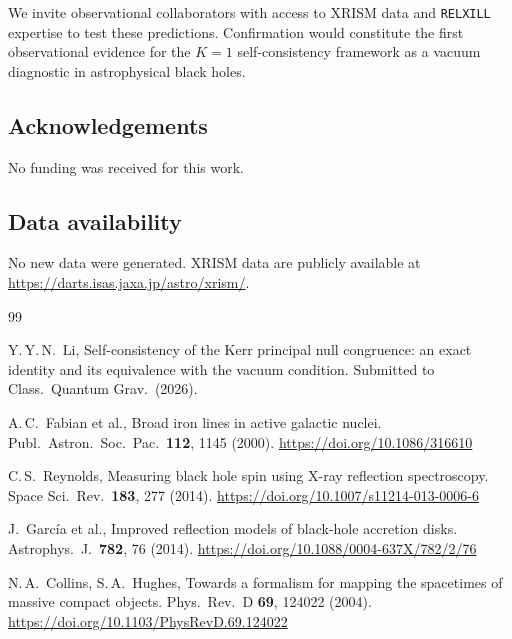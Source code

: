 \documentclass[12pt,a4paper]{article}
\begin{document}
We invite observational collaborators with access to XRISM
data and {\tt RELXILL} expertise to test these predictions.
Confirmation would constitute the first observational evidence
for the $K=1$ self-consistency framework as a vacuum diagnostic
in astrophysical black holes.

\subsection*{Acknowledgements}
No funding was received for this work.

\subsection*{Data availability}
No new data were generated. XRISM data are publicly available
at \url{https://darts.isas.jaxa.jp/astro/xrism/}.

\begin{thebibliography}{99}

Y.\,Y.\,N.~Li,
Self-consistency of the Kerr principal null congruence:
an exact identity and its equivalence with the vacuum condition.
Submitted to Class.\ Quantum Grav.\ (2026).

A.\,C.~Fabian et al.,
Broad iron lines in active galactic nuclei.
Publ.\ Astron.\ Soc.\ Pac.\ \textbf{112}, 1145 (2000).
\url{https://doi.org/10.1086/316610}

C.\,S.~Reynolds,
Measuring black hole spin using X-ray reflection spectroscopy.
Space Sci.\ Rev.\ \textbf{183}, 277 (2014).
\url{https://doi.org/10.1007/s11214-013-0006-6}

J.~Garc\'ia et al.,
Improved reflection models of black-hole accretion disks.
Astrophys.\ J.\ \textbf{782}, 76 (2014).
\url{https://doi.org/10.1088/0004-637X/782/2/76}

N.\,A.~Collins, S.\,A.~Hughes,
Towards a formalism for mapping the spacetimes of massive
compact objects.
Phys.\ Rev.\ D \textbf{69}, 124022 (2004).
\url{https://doi.org/10.1103/PhysRevD.69.124022}

\end{thebibliography}
\end{document}
